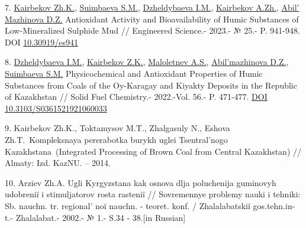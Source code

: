 \begin{references}
7.
\href{https://www.scopus.com/authid/detail.uri?authorId=55910705200}{Kairbekov
Zh.K.},
\href{https://www.scopus.com/authid/detail.uri?authorId=57201691853}{Suimbaeva
S.M.},
\href{https://www.scopus.com/authid/detail.uri?authorId=56600659100}{Dzheldybaeva
I.M.},
\href{https://www.scopus.com/authid/detail.uri?authorId=56600640700}{Kairbekov
A.Zh.},
\href{https://www.scopus.com/authid/detail.uri?authorId=58021595400}{Abil' Mazhinova
D.Z.} Antioxidant Activity and Bioavailability of Humic Substances of
Low-Mineralized Sulphide Mud // Engineered Science.- 2023.- № 25.- P.
941-948. DOI \href{http://dx.doi.org/10.30919/es941}{10.30919/es941}

8.
\href{https://www.scopus.com/authid/detail.uri?authorId=56600659100}{Dzheldybaeva
I.M.},
\href{https://www.scopus.com/authid/detail.uri?authorId=55910705200}{Kairbekov
Z.K.},
\href{https://www.scopus.com/authid/detail.uri?authorId=7003481604}{Maloletnev
A.S.},
\href{https://www.scopus.com/authid/detail.uri?authorId=58021595400}{Abil'mazhinova
D.Z.},
\href{https://www.scopus.com/authid/detail.uri?authorId=57201691853}{Suimbaeva
S.M.} Physicochemical and Antioxidant Properties of Humic Substances
from Coals of the Oy-Karagay and Kiyakty Deposits in the Republic of
Kazakhstan // Solid Fuel Chemistry.- 2022.-Vol. 56.- P. 471-477.
\href{https://doi.org/10.3103/S0361521921060033}{DOI
10.3103/S0361521921060033}

9. Kairbekov Zh.K., Toktamysov M.T., Zhalgasuly N., Eshova
Zh.T.~Kompleksnaya pererabotka burykh uglei Tsentral'nogo
Kazakhstana~(Integrated Processing of Brown Coal from Central
Kazakhstan) // Almaty: Izd. KazNU. -- 2014.

10. Arziev Zh.A. Ugli Kyrgyzstana kak osnova dlja poluchenija guminovyh
udobreniĭ i stimuljatorov rosta rasteniĭ // Sovremennye problemy nauki i
tehniki: Sb. nauchn. tr. regional' noĭ nauchn. - teoret.
konf. / Zhalalabatskiĭ gos.tehn.in-t.- Zhalalabat.- 2002.- № 1.- S.34 -
38.{[}in Russian{]}
\end{references}

